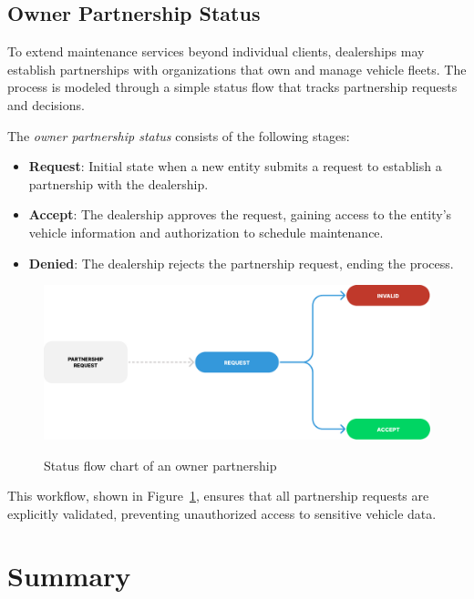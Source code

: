 \subsection{Owner Partnership Status} 

To extend maintenance services beyond individual clients, dealerships may establish partnerships with organizations that own and manage vehicle fleets. The process is modeled through a simple status flow that tracks partnership requests and decisions.

The \textit{owner partnership status} consists of the following stages:

\begin{itemize}
\item \textbf{Request}: Initial state when a new entity submits a request to establish a partnership with the dealership.
\item \textbf{Accept}: The dealership approves the request, gaining access to the entity's vehicle information and authorization to schedule maintenance.
\item \textbf{Denied}: The dealership rejects the partnership request, ending the process.
\end{itemize}

\begin{figure}[h]
  \caption{Status flow chart of an owner partnership}
  \centering
  \includegraphics[width=\textwidth]{figs/Status/OwnerPartnership_StatusDiagram}
  \label{fig:ownerPartnershipFlowChart}
\end{figure}

This workflow, shown in Figure~\ref{fig:ownerPartnershipFlowChart}, ensures that all partnership requests are explicitly validated, preventing unauthorized access to sensitive vehicle data.





\section{Summary}


